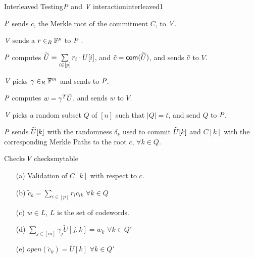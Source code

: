 \begin{protocolbox}{Interleaved Testing}{$\P$ and $\V$ interaction}{interleaved1}
	\begin{myitemize}
		\item $\P$ sends $c$, the Merkle root of the commitment $C$, to $\V$.
		\item $\V$ sends a $r\in_R \bbF^p$ to $\P$ .
		\item $\P$ computes $\tU=\sum\limits_{i\in[p]} r_i\cdot U[i]$, and  $ \tc = \com(\tU)$, and sends $\tc$ to $V$.
		\item $\V$ picks $\gamma \in_R \bbF^m$ and sends to $\P$.
		\item $\P$ computes $w=\gamma^T\tU$, and sends $w$ to $V$.
		\item $\V$ picks a random subset $Q$ of $[n]$ such that $|Q|=t$, and send $Q$ to $\P$.
		\item $\P$ sends $\tU[k]$ with the randomness $\delta_k$ used to commit $\tU[k]$ and $C[k]$ with the corresponding Merkle Paths to the root $c$, $\forall k\in Q$.
	\end{myitemize}
\end{protocolbox}

\begin{algobox}{Checks}{$\V$ checks}{mytable}
	\begin{itemize}
		\item[(a)] Validation of $C[k]$ with respect to $c$.
		\item[(b)] $\tilde{c}_k = \sum\limits_{i\in[p]} r_ic_{ik}$ $\forall k\in Q$
		\item[(c)] $w\in L$, $L$ is the set of codewords.
		\item[(d)] $\sum\limits_{j\in [m]} \gamma_j \widetilde{U}[j,k] = w_k$ $\forall k\in Q'$
		\item[(e)] $open(\tilde{c}_k) = \widetilde{U}[k]$ $\forall k\in Q'$
	\end{itemize}
\end{algobox}

